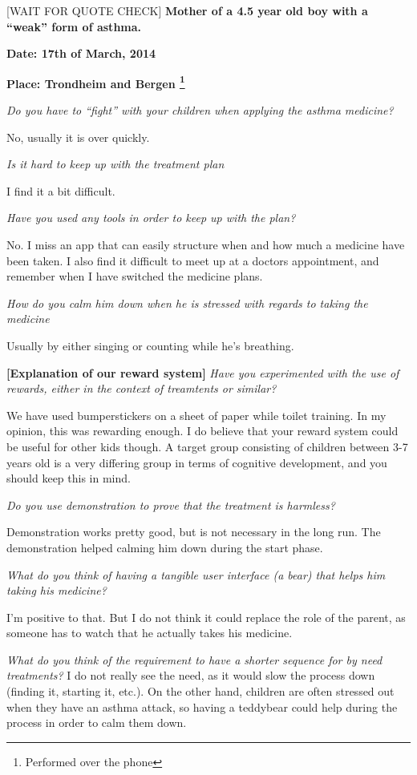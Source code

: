 [WAIT FOR QUOTE CHECK]
\textbf{Mother of a 4.5 year old boy with a ``weak'' form of asthma.}

\textbf{Date: 17th of March, 2014}

\textbf{Place: Trondheim and Bergen \footnote{Performed over the phone}} 

\emph{Do you have to ``fight'' with your children when applying the asthma medicine?}

No, usually it is over quickly.

\emph{Is it hard to keep up with the treatment plan}

I find it a bit difficult. 

\emph{Have you used any tools in order to keep up with the plan?}

No. I miss an app that can easily structure when and how much a medicine have been taken. 
I also find it difficult to meet up at a doctors appointment, and remember when I have switched the medicine plans. 

\emph{How do you calm him down when he is stressed with regards to taking the medicine}

Usually by either singing or counting while he's breathing. 

\textbf{[Explanation of our reward system]}
\emph{Have you experimented with the use of rewards, either in the context of treamtents or similar?}

We have used bumperstickers on a sheet of paper while toilet training. In my opinion, this was rewarding enough. I do believe that your reward system could be useful for other kids though. A target group consisting of children between 3-7 years old is a very differing group in terms of cognitive development, and you should keep this in mind.  

\emph{Do you use demonstration to prove that the treatment is harmless?}

Demonstration works pretty good, but is not necessary in the long run. The demonstration helped calming him down during the start phase. 

\emph{What do you think of having a tangible user interface (a bear) that helps him taking his medicine?}

I'm positive to that. But I do not think it could replace the role of the parent, as someone has to watch that he actually takes his medicine. 

\emph{What do you think of the requirement to have a shorter sequence for by need treatments? }
I do not really see the need, as it would slow the process down (finding it, starting it, etc.). On the other hand, children are often stressed out when they have an asthma attack, so having a teddybear could help during the process in order to calm them down. 

